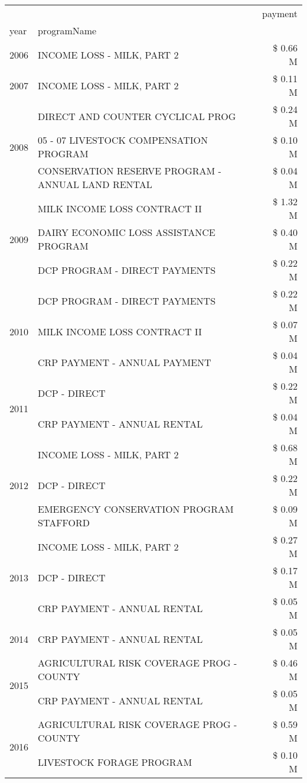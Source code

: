 \begin{tabular}{llr}
\toprule
 &  & payment \\
year & programName &  \\
\midrule
2006 & INCOME LOSS - MILK, PART 2 & \$ 0.66 M \\
\cline{1-3}
2007 & INCOME LOSS - MILK, PART 2 & \$ 0.11 M \\
\cline{1-3}
\multirow[t]{3}{*}{2008} & DIRECT AND COUNTER CYCLICAL PROG & \$ 0.24 M \\
 & 05 - 07 LIVESTOCK COMPENSATION PROGRAM & \$ 0.10 M \\
 & CONSERVATION RESERVE PROGRAM - ANNUAL LAND RENTAL & \$ 0.04 M \\
\cline{1-3}
\multirow[t]{3}{*}{2009} & MILK INCOME LOSS CONTRACT II & \$ 1.32 M \\
 & DAIRY ECONOMIC LOSS ASSISTANCE PROGRAM & \$ 0.40 M \\
 & DCP PROGRAM - DIRECT PAYMENTS & \$ 0.22 M \\
\cline{1-3}
\multirow[t]{3}{*}{2010} & DCP PROGRAM - DIRECT PAYMENTS & \$ 0.22 M \\
 & MILK INCOME LOSS CONTRACT II & \$ 0.07 M \\
 & CRP PAYMENT - ANNUAL PAYMENT & \$ 0.04 M \\
\cline{1-3}
\multirow[t]{2}{*}{2011} & DCP - DIRECT & \$ 0.22 M \\
 & CRP PAYMENT - ANNUAL RENTAL & \$ 0.04 M \\
\cline{1-3}
\multirow[t]{3}{*}{2012} & INCOME LOSS - MILK, PART 2 & \$ 0.68 M \\
 & DCP - DIRECT & \$ 0.22 M \\
 & EMERGENCY CONSERVATION PROGRAM STAFFORD & \$ 0.09 M \\
\cline{1-3}
\multirow[t]{3}{*}{2013} & INCOME LOSS - MILK, PART 2 & \$ 0.27 M \\
 & DCP - DIRECT & \$ 0.17 M \\
 & CRP PAYMENT - ANNUAL RENTAL & \$ 0.05 M \\
\cline{1-3}
2014 & CRP PAYMENT - ANNUAL RENTAL & \$ 0.05 M \\
\cline{1-3}
\multirow[t]{2}{*}{2015} & AGRICULTURAL RISK COVERAGE PROG - COUNTY & \$ 0.46 M \\
 & CRP PAYMENT - ANNUAL RENTAL & \$ 0.05 M \\
\cline{1-3}
\multirow[t]{3}{*}{2016} & AGRICULTURAL RISK COVERAGE PROG - COUNTY & \$ 0.59 M \\
 & LIVESTOCK FORAGE PROGRAM & \$ 0.10 M \\

\end{tabular}
